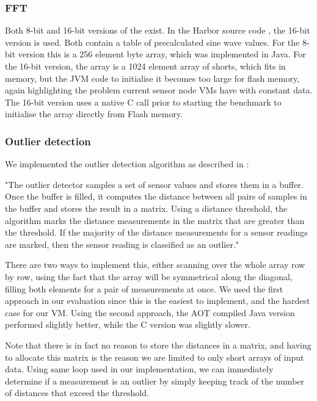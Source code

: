 \subsubsection{FFT}
Both 8-bit and 16-bit versions of the  exist. In the Harbor source code \cite{sos-operating-system}, the 16-bit version is used. Both contain a table of precalculated sine wave values. For the 8-bit version this is a 256 element byte array, which was implemented in Java. For the 16-bit version, the array is a 1024 element array of shorts, which fits in memory, but the JVM code to initialise it becomes too large for flash memory, again highlighting the problem current sensor node VMs have with constant data. The 16-bit version uses a native C call prior to starting the benchmark to initialise the array directly from Flash memory.

\subsubsection{Outlier detection}
We implemented the outlier detection algorithm as described in \cite{Kumar:2007ge}:

\begin{displayquote}
"The outlier detector samples a set of sensor values and stores them in a buffer. Once the buffer is filled, it computes the distance between all pairs of samples in the buffer and stores the result in a matrix. Using a distance threshold, the algorithm marks the distance measurements in the matrix that are greater than the threshold. If the majority of the distance measurements for a sensor readings are marked, then the sensor reading is classified as an outlier."
\end{displayquote}

There are two ways to implement this, either scanning over the whole array row by row, using the fact that the array will be symmetrical along the diagonal, filling both elements for a pair of measurements at once. We used the first approach in our evaluation since this is the easiest to implement, and the hardest case for our VM. Using the second approach, the AOT compiled Java version performed slightly better, while the C version was slightly slower.

Note that there is in fact no reason to store the distances in a matrix, and having to allocate this matrix is the reason we are limited to only short arrays of input data. Using same loop used in our implementation, we can immediately determine if a measurement is an outlier by simply keeping track of the number of distances that exceed the threshold.

